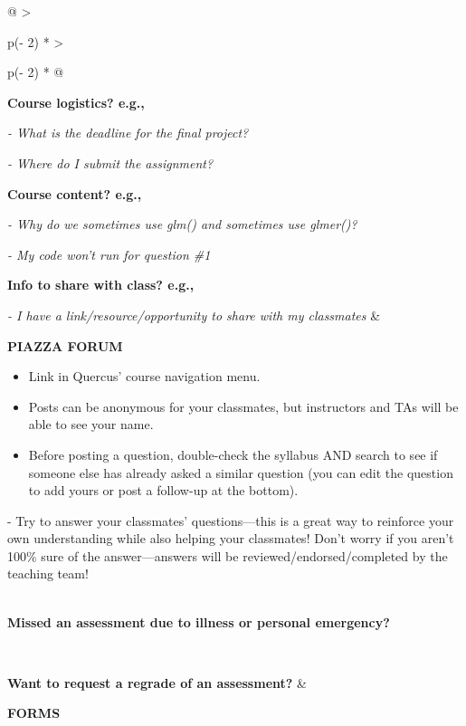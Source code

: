 \documentclass[
  openany]{book}
\begin{document}
\begin{longtable}[]{@{}
  >{\raggedright\arraybackslash}p{(\columnwidth - 2\tabcolsep) * }
  >{\raggedright\arraybackslash}p{(\columnwidth - 2\tabcolsep) * }@{}}
\toprule
\endhead
\textbf{Course logistics? e.g.,}

\emph{- What is the deadline for the final project?}

\emph{- Where do I submit the assignment?}

\textbf{Course content? e.g.,}

\emph{- Why do we sometimes use glm() and sometimes use glmer()?}

\emph{- My code won't run for question \#1}

\textbf{Info to share with class? e.g.,}

\emph{- I have a link/resource/opportunity to share with my classmates} & \begin{minipage}[t]{\linewidth}\raggedright
\textbf{PIAZZA FORUM}

\begin{itemize}
\item
  Link in Quercus' course navigation menu.
\item
  Posts can be anonymous for your classmates, but instructors and TAs will be able to see your name.
\item
  Before posting a question, double-check the syllabus AND search to see if someone else has already asked a similar question (you can edit the question to add yours or post a follow-up at the bottom).
\end{itemize}

- Try to answer your classmates' questions---this is a great way to reinforce your own understanding while also helping your classmates! Don't worry if you aren't 100\% sure of the answer---answers will be reviewed/endorsed/completed by the teaching team!
\end{minipage} \\
\textbf{Missed an assessment due to illness or personal emergency?}

~

\textbf{Want to request a regrade of an assessment?} & \begin{minipage}[t]{\linewidth}\raggedright
\textbf{FORMS}


\end{minipage}
\end{longtable}
\end{document}

